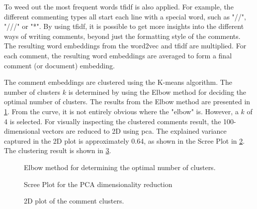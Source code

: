To weed out the most frequent words \acrshort{tfidf} is also applied. For example, the different commenting types all start each line with a special word, such as "//", "///" or "*". By using \acrshort{tfidf}, it is possible to get more insights into the different ways of writing comments, beyond just the formatting style of the comments. The resulting word embeddings from the word2vec and \acrshort{tfidf} are multiplied. For each comment, the resulting word embeddings are averaged to form a final comment (or document) embedding.

The comment embeddings are clustered using the K-means algorithm. The number of clusters \(k\) is determined by using the Elbow method for deciding the optimal number of clusters. The results from the Elbow method are presented in \cref{fig:elbow}. From the curve, it is not entirely obvious where the "elbow" is. However, a \(k\) of 4 is selected. For visually inspecting the clustered comments result, the 100-dimensional vectors are reduced to 2D using \acrfull{pca}. The explained variance captured in the 2D plot is approximately 0.64, as shown in the Scree Plot in \cref{fig:scree-plot}. The clustering result is shown in \cref{fig:comment-clusters}.


\begin{figure}[htbp]
    \centering
    
    \caption{Elbow method for determining the optimal number of clusters.}
    \label{fig:elbow}
\end{figure}

\begin{figure}[htbp]
    \centering
    
    \caption{Scree Plot for the PCA dimensionality reduction}
    \label{fig:scree-plot}
\end{figure}


\begin{figure}[htbp]
    \centering
    
    \caption{2D plot of the comment clusters.}
    \label{fig:comment-clusters}
\end{figure}

